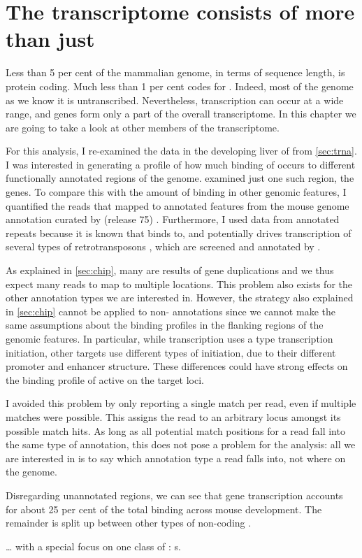 \chapter{The  transcriptome consists of more than just }

Less than \num{5} per cent of the mammalian genome, in terms of sequence length,
is protein coding. Much less than \num{1} per cent codes for \trna[s]. Indeed,
most of the genome as we know it is untranscribed\todo[ref]{}. Nevertheless,
 transcription can occur at a wide range, and \trna genes form only a part
of the overall  transcriptome. In this chapter we are going to take a look
at other members of the  transcriptome.

For this analysis, I re-examined the \chipseq data in the developing liver of
\mmu from \cref{sec:trna}. I was interested in generating a profile of how much
binding of  occurs to different functionally annotated regions of the
genome.  examined just one such region, the \trna genes. To
compare this with the amount of binding in other genomic features, I quantified
the \chipseq reads that mapped to annotated features from the 
mouse genome annotation curated by  (release \num{75})
\citep{Flicek:2014}. Furthermore, I used data from annotated repeats because it
is known that  binds to, and potentially drives transcription of several
types of retrotransposons \citep{Carriere:2012}, which are screened and
annotated by  \citep{Smit:2014}.

As explained in \cref{sec:chip}, many \trna[s] are results of gene duplications
and we thus expect many reads to map to multiple locations. This problem also
exists for the other annotation types we are interested in. However, the
strategy also explained in \cref{sec:chip} cannot be applied to non-\trna
annotations since we cannot make the same assumptions about the binding
profiles in the flanking regions of the genomic features. In particular, while
\trna transcription uses a type  transcription initiation, other
 targets use different types of initiation, due to their different promoter
and enhancer structure. These differences could have strong effects on the
binding profile of active  on the target loci.

I avoided this problem by only reporting a single match per read, even if
multiple matches were possible. This assigns the read to an arbitrary locus
amongst its possible match hits. As long as all potential match positions for a
read fall into the same type of annotation, this does not pose a problem for the
analysis: all we are interested in is to say which annotation type a read falls
into, not where on the genome.


Disregarding unannotated regions, we can see that \trna gene transcription
accounts for about \num{25} per cent of the total  binding across mouse
development. The remainder is split up between other types of non-coding
\rna[s].

… with a special focus on one class
of : s.

